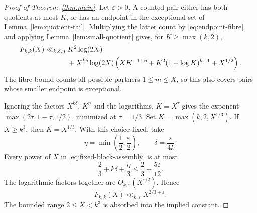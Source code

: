 \begin{proof}[Proof of Theorem~\ref{thm:main}]
Let $\varepsilon>0$. A counted pair either has both quotients at most
$K$, or has an endpoint in the exceptional set of
Lemma~\ref{lem:quotient-tail}. Multiplying the latter count by
\eqref{eq:endpoint-fibre} and applying Lemma~\ref{lem:small-quotient}
gives, for $K\ge\max(k,2)$,
\begin{align}\label{eq:fixed-block-assembly}
F_{k,k}(X)\ll_{k,\delta,\eta}{}&K^2\log(2X)\notag\\
&+X^{k\delta}\log(2X)
\left(XK^{-1+\eta}+K^2(1+\log K)^{k-1}+X^{1/2}\right).
\end{align}
The fibre bound counts all possible partners $1\le m\le X$, so this
also covers pairs whose smaller endpoint is exceptional.

Ignoring the factors $X^{k\delta}$, $K^\eta$ and the logarithms,
$K=X^\tau$ gives the exponent $\max(2\tau,1-\tau,1/2)$, minimized at
$\tau=1/3$. Set $K=\max(k,2,X^{1/3})$. If $X\ge k^3$, then
$K=X^{1/3}$. With this
choice fixed, take
\[
\eta=\min\left(\frac12,\frac\varepsilon2\right),
\qquad \delta=\frac\varepsilon{4k}.
\]
Every power of $X$ in \eqref{eq:fixed-block-assembly} is at most
\[
\frac23+k\delta+\frac\eta3
\le\frac23+\frac{5\varepsilon}{12}.
\]
The logarithmic factors together are
$O_{k,\varepsilon}(X^{\varepsilon/2})$. Hence
\[
F_{k,k}(X)\ll_{k,\varepsilon}X^{2/3+\varepsilon}.
\]
The bounded range $2\le X<k^3$ is absorbed into the implied constant.
\end{proof}
